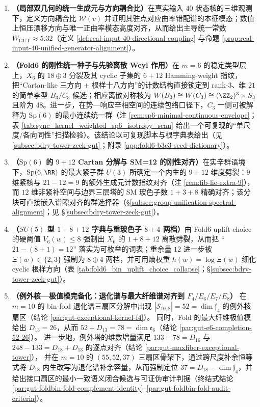 \begin{enumerate}
  \item \textbf{（局部双几何的统一生成元与方向耦合比）}在真实输入 40 状态核的三维观测下，定义方向耦合比 \(\mathcal{W}(v)\) 并证明其驻点对应曲率错配谱的本征模态；数值上恒压漂移方向与唯一正曲率模态高度对齐，从而给出主导统一常数 \(W_{\mathrm{GUT}}\approx 5.32\)（定义 \ref{def:real-input-40-directional-coupling} 与命题 \ref{prop:real-input-40-unified-generator-alignment}）。
  \item \textbf{（Fold6 的刚性统一种子与先验离散 Weyl 作用）}在 \(m=6\) 的稳定类型层上，\(X_6\) 的 \(18\oplus 3\) 分裂及其 cyclic 子集的 \(6+12\) Hamming-weight 指纹，把“Cartan-like 三方向 + 根样十八方向”的计数结构直接锁定到 rank-\(3\)、维 \(21\) 的简单李型 \(B_3/C_3\) 候选；相应离散对称核为 \(W(B_3)\cong W(C_3)\cong (\ZZ_2)^3\rtimes S_3\) 且阶为 \(48\)。进一步，在势—响应辛相空间的连续包络口径下，\(C_3\) 一侧可被解释为 \(\mathrm{Sp}(6)\) 的最小连续统一群（注 \ref{rem:sp6-minimal-continuous-envelope}；表 \ref{tab:sync_kernel_weighted_sp6_isotropy_scan} 给出一个可复现的“单尺度/各向同性”扫描检验）。该结论以可复现脚本与根字典表给出（见 \ref{subsec:bdry-tower-zeck-gut}；附录 \ref{app:fold6-b3c3-seed-dictionary}）。
  \item \textbf{（\texorpdfstring{$\mathrm{Sp}(6)$}{Sp(6)} 的 $9+12$ Cartan 分解与 SM=12 的刚性对齐）}在实辛群语境下，\(\mathrm{Sp}(6,\RR)\) 的最大紧子群 \(U(3)\) 所确定一个内生的 \(9+12\) 维度劈裂：\(9\) 维紧核与 \(21-12=9\) 的额外生成元计数指纹对齐（注 \ref{rem:fib-lie-extra-9}），而 \(12\) 维非紧补空间与边界三层塔的 SM 玻色子数 \(1+3+8\) 精确对齐；该分块可直接嵌入谱隙对齐的群选择器（\S\ref{subsec:group-unification-spectral-alignment}；见 \S\ref{subsec:bdry-tower-zeck-gut}）。
  \item \textbf{（\texorpdfstring{$SU(5)$}{SU(5)} 型 $1+8+12$ 字典与重玻色子 $8+4$ 两档）}由 Fold6 uplift-choice 的硬阈值 \(V_6(w)\le 8\) 强制出 \(X_6\) 的 \(1+8+12\) 离散劈裂，从而把 “\(21-(8+1)=12\)” 落实为可枚举的词表；重余量 \(12\) 进一步被 \(\Xi(w)\in\{2,3\}\) 强制为 \(8\oplus 4\) 两档，并可用熵权重 \(h(w)=\log\Xi(w)\) 细化 cyclic 根样方向（表 \ref{tab:fold6_bin_uplift_choice_collapse}；\S\ref{subsec:bdry-tower-zeck-gut}）。
  \item \textbf{（例外核—极值模完备化：退化谱与最大纤维谱对齐到 \texorpdfstring{$F_4/E_6/E_7/E_8$}{F4/E6/E7/E8}）}
  在 \(m=10\) 的 bin-fold 退化谱三扇区分解中出现 \(|\mathcal{S}_{10,8}|=52=\dim\mathfrak{f}_4\) 的例外核扇区（结论 \ref{par:gut-exceptional-kernel-f4}）。
  同时，Fold 的最大纤维极值模给出 \(D_{13}=26\)，从而 \(52+D_{13}=78=\dim\mathfrak{e}_6\)（结论 \ref{par:gut-e6-completion-52-26}）。
  进一步地，例外塔的维数增量满足 \(133-78=D_{16}\) 与 \(248-133=D_{18}+D_{13}\) 的逐点对齐（结论 \ref{par:gut-maxfiber-exceptional-tower}），
  并在 \(m=10\) 的 \((55,52,37)\) 三扇区骨架下，通过跨尺度补余恒等式将 \(D_{18}\) 内生改写为退化谱补余容量，从而强制定位 \(37=D_{18}-\dim\mathfrak{f}_4\)，并给出接口扇区的最小一致语义闭合候选与可证伪审计判据（终结式结论 \ref{par:gut-foldbin-fold-complement-identity}--\ref{par:gut-foldbin-fold-audit-criteria}）。
\end{enumerate}

